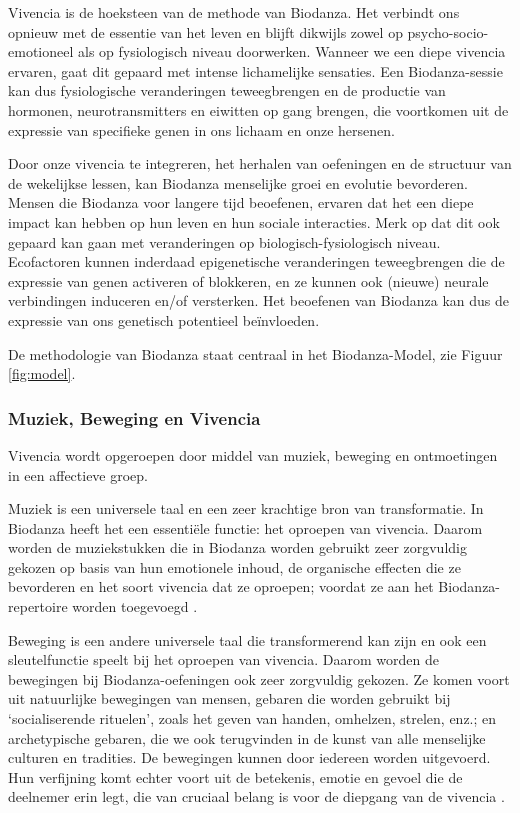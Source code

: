 \documentclass[
  11pt,
]{book}
\begin{document}
Vivencia is de hoeksteen van de methode van Biodanza. Het verbindt ons opnieuw met de essentie van het leven en blijft dikwijls zowel op psycho-socio-emotioneel als op fysiologisch niveau doorwerken. Wanneer we een diepe vivencia ervaren, gaat dit gepaard met intense lichamelijke sensaties. Een Biodanza-sessie kan dus fysiologische veranderingen teweegbrengen en de productie van hormonen, neurotransmitters en eiwitten op gang brengen, die voortkomen uit de expressie van specifieke genen in ons lichaam en onze hersenen.

Door onze vivencia te integreren, het herhalen van oefeningen en de structuur van de wekelijkse lessen, kan Biodanza menselijke groei en evolutie bevorderen. Mensen die Biodanza voor langere tijd beoefenen, ervaren dat het een diepe impact kan hebben op hun leven en hun sociale interacties. Merk op dat dit ook gepaard kan gaan met veranderingen op biologisch-fysiologisch niveau. Ecofactoren kunnen inderdaad epigenetische veranderingen teweegbrengen die de expressie van genen activeren of blokkeren, en ze kunnen ook (nieuwe) neurale verbindingen induceren en/of versterken. Het beoefenen van Biodanza kan dus de expressie van ons genetisch potentieel beïnvloeden.

De methodologie van Biodanza staat centraal in het Biodanza-Model, zie Figuur \ref{fig:model}.

\hypertarget{muziek-beweging-en-vivencia}{%
\subsubsection{Muziek, Beweging en Vivencia}\label{muziek-beweging-en-vivencia}}

Vivencia wordt opgeroepen door middel van muziek, beweging en ontmoetingen in een affectieve groep.

Muziek is een universele taal en een zeer krachtige bron van transformatie. In Biodanza heeft het een essentiële functie: het oproepen van vivencia. Daarom worden de muziekstukken die in Biodanza worden gebruikt zeer zorgvuldig gekozen op basis van hun emotionele inhoud, de organische effecten die ze bevorderen en het soort vivencia dat ze oproepen; voordat ze aan het Biodanza-repertoire worden toegevoegd \citep{toro2008}.

Beweging is een andere universele taal die transformerend kan zijn en ook een sleutelfunctie speelt bij het oproepen van vivencia. Daarom worden de bewegingen bij Biodanza-oefeningen ook zeer zorgvuldig gekozen. Ze komen voort uit natuurlijke bewegingen van mensen, gebaren die worden gebruikt bij `socialiserende rituelen', zoals het geven van handen, omhelzen, strelen, enz.; en archetypische gebaren, die we ook terugvinden in de kunst van alle menselijke culturen en tradities. De bewegingen kunnen door iedereen worden uitgevoerd. Hun verfijning komt echter voort uit de betekenis, emotie en gevoel die de deelnemer erin legt, die van cruciaal belang is voor de diepgang van de vivencia \citep{toro2008}.
\end{document}
